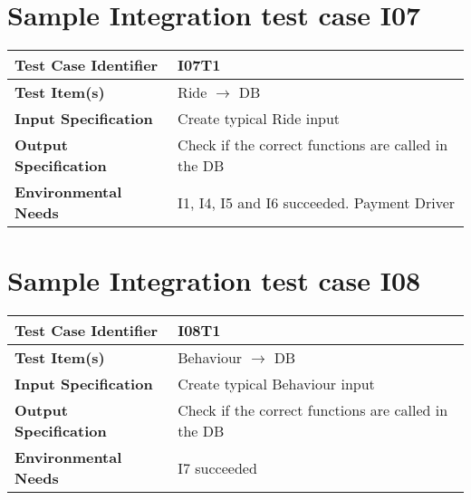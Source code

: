 \section{Sample Integration test case I07}\label{I07}
\begin{center}
	\vspace{0.6cm}
	\begin{tabular}{|l|l|}
		\hline
		\textbf{Test Case Identifier} & I07T1 \bigstrut \\\hline
		\textbf{Test Item(s)} & Ride \ensuremath{\rightarrow} DB \bigstrut \\\hline
		\textbf{Input Specification} & Create typical Ride input \bigstrut \\\hline
		\textbf{Output Specification} & Check if the correct functions are called in the DB \bigstrut \\\hline
		\textbf{Environmental Needs} & I1, I4, I5 and I6 succeeded. Payment Driver\bigstrut \\\hline
	\end{tabular}
\end{center}

\section{Sample Integration test case I08}\label{I08}
\begin{center}
	\vspace{0.6cm}
	\begin{tabular}{|l|l|}
		\hline
		\textbf{Test Case Identifier} & I08T1 \bigstrut \\\hline
		\textbf{Test Item(s)} & Behaviour \ensuremath{\rightarrow} DB \bigstrut \\\hline
		\textbf{Input Specification} & Create typical Behaviour input \bigstrut \\\hline
		\textbf{Output Specification} & Check if the correct functions are called in the DB \bigstrut \\\hline
		\textbf{Environmental Needs} & I7 succeeded \bigstrut \\\hline
	\end{tabular}
\end{center}


